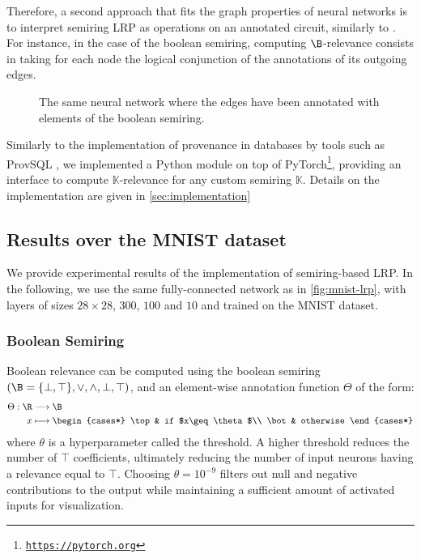 \documentclass[twocolumn]{../cs-classes/cs-classes}
\newcommand*{\K}{\mathbb{K}}
\newcommand*{\1}{\digitsbb{1}}
\newcommand*{\0}{\digitsbb{0}}
\begin{document}
Therefore, a second approach that fits the graph properties of neural networks is to interpret semiring LRP as operations on an annotated circuit, similarly to \cite{senellart2018provenance}. For instance, in the case of the boolean semiring, computing $\B$-relevance consists in taking for each node the logical conjunction of the annotations of its outgoing edges.

\begin{figure}[H]
    \centering
    
    \caption{The same neural network where the edges have been annotated with elements of the boolean semiring.}
\end{figure}

Similarly to the implementation of provenance in databases by tools such as ProvSQL \cite{provsql}, we implemented a Python module on top of PyTorch\footnote{\href{https://pytorch.org}{\texttt{https://pytorch.org}}}, providing an interface to compute $\K$-relevance for any custom semiring $\K$. Details on the implementation are given in \autoref{sec:implementation}

\subsection{Results over the MNIST dataset}
We provide experimental results of the implementation of semiring-based LRP. In the following, we use the same fully-connected network as in \autoref{fig:mnist-lrp}, with layers of sizes $28\times28$, $300$, $100$ and $10$ and trained on the MNIST dataset.
\subsubsection{Boolean Semiring}
Boolean relevance can be computed using the boolean semiring $(\B=\{\bot, \top\}, \lor, \land, \bot, \top)$, and an element-wise annotation function $\Theta$ of the form:
\begin{equation*}
    \begin{aligned}
        \Theta: \R&\longrightarrow \B\\
        x&\longmapsto \begin{cases*}
            \top & if $x\geq\theta$\\
            \bot & otherwise
        \end{cases*}
    \end{aligned}
\end{equation*}
where $\theta$ is a hyperparameter called the threshold. A higher threshold reduces the number of $\top$ coefficients, ultimately reducing the number of input neurons having a relevance equal to $\top$. Choosing $\theta=10^{-9}$ filters out null and negative contributions to the output while maintaining a sufficient amount of activated inputs for visualization.
\end{document}
